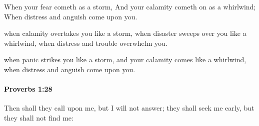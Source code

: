 			\begin{versebox}
					\item[BHS] 
					\item[ASV] When your fear cometh as a storm, And your calamity cometh on as a whirlwind; When distress and anguish come upon you.
					\item[NIV] when calamity overtakes you like a storm, when disaster sweeps over you like a whirlwind, when distress and trouble overwhelm you.
					\item[NRSV] when panic strikes you like a storm, and your calamity comes like a whirlwind, when distress and anguish come upon you.
			\end{versebox}

		\paragraph{Proverbs 1:28} %
			\label{PROVERBS-1-28}

			Then shall they call upon me, but I will not answer; they shall seek me early, but they shall not find me:

